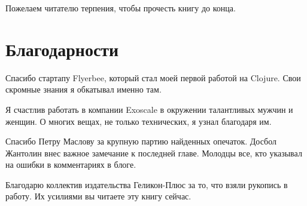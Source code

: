 Пожелаем читателю терпения, чтобы прочесть книгу до конца.

\section*{Благодарности}


Спасибо стартапу Flyerbee, который стал моей первой работой на Clojure. Свои
скромные знания я обкатывал именно там.

Я счастлив работать в компании Exoscale в окружении талантливых мужчин и
женщин. О многих вещах, не только технических, я узнал благодаря им.

Спасибо Петру Маслову за крупную партию найденных опечаток. Досбол Жантолин внес
важное замечание к последней главе. Молодцы все, кто указывал на ошибки в
комментариях в блоге.

Благодарю коллектив издательства Геликон-Плюс за то, что взяли рукопись в
работу. Их усилиями вы читаете эту книгу сейчас.
